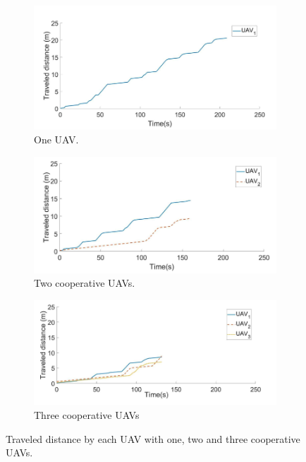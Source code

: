 \documentclass[11pt,openany]{book}
\begin{document}
\begin{figure}[H]
    \centering
    \begin{subfigure}[H]{0.7\linewidth}
        \includegraphics[width=\linewidth]{assets/3_20_a.png}
        \caption{{One UAV.}}
        \label{fig:3.20a}
    \end{subfigure}
    \begin{subfigure}[H]{0.7\linewidth}
        \includegraphics[width=\linewidth]{assets/3_20_b.png}
        \caption{{Two cooperative UAVs.}}
        \label{fig:3.20b}
    \end{subfigure}
    \begin{subfigure}[H]{0.7\linewidth}
        \includegraphics[width=\linewidth]{assets/3_20_c.png}
        \caption{{Three cooperative UAVs}}
        \label{fig:3.20c}
    \end{subfigure}
    \caption{Traveled distance by each UAV with one, two and three cooperative UAVs.}
    \label{fig:3.20}
\end{figure}
\end{document}
